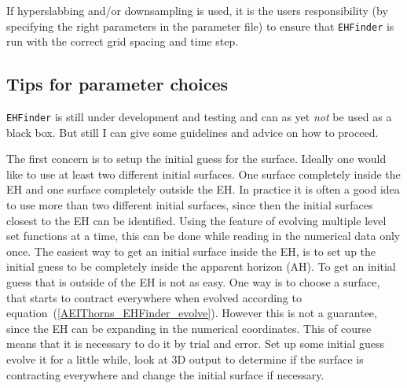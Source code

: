 If hyperslabbing and/or downsampling is used, it is the users responsibility
(by specifying the right parameters in the parameter file) to ensure that
{\tt EHFinder} is run with the correct grid spacing and time step.

\subsection{Tips for parameter choices}

{\tt EHFinder} is still under development and testing and can as yet {\em not}
be used as a black box. But still I can give some guidelines and advice on
how to proceed.

The first concern is to setup the initial guess for the surface. Ideally one
would like to use at least two different initial surfaces. One surface 
completely inside the EH and one surface completely outside the EH. In
practice it is often a good idea to use more than two different initial
surfaces, since then the initial surfaces closest to the EH can be identified.
Using the feature of evolving multiple level set functions at a time, this
can be done while reading in the numerical data only once. The easiest way
to get an initial surface inside the EH, is to set up the initial guess to
be completely inside the
apparent horizon (AH). To get an initial guess that is outside of the EH
is not as easy. One way is to choose a surface, that starts to contract
everywhere when evolved according to
equation~(\ref{AEIThorns_EHFinder_evolve}). However this is not a
guarantee, since the EH can be expanding in the numerical coordinates.
This of course means that it is necessary to do it by trial and error.
Set up some initial guess evolve it for a little while, look at 3D output
to determine if the surface is contracting everywhere and change the
initial surface if necessary.

